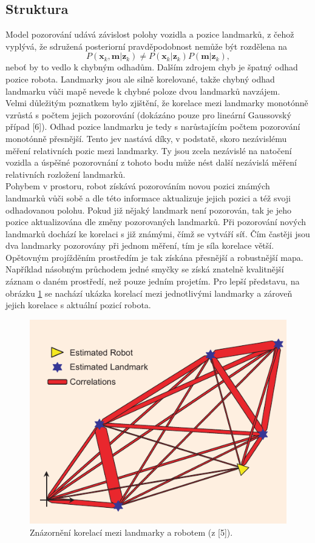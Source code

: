 \documentclass[12pt]{report}
\begin{document}
\subsection{Struktura}
Model pozorování udává závislost polohy vozidla a pozice landmarků, z čehož vyplývá, že sdružená posteriorní pravděpodobnost nemůže být rozdělena na
\begin{equation}
	P(\textbf{x}_k,\textbf{m}|\textbf{z}_k)\neq P(\textbf{x}_k|\textbf{z}_k)P(\textbf{m}|\textbf{z}_k),
\end{equation}
neboť by to vedlo k chybným odhadům. Dalším zdrojem chyb je špatný odhad pozice robota. Landmarky jsou ale silně korelované, takže chybný odhad landmarku vůči mapě nevede k chybné poloze dvou landmarků navzájem.\\
\indent Velmi důležitým poznatkem bylo zjištění, že korelace mezi landmarky monotónně vzrůstá s počtem jejich pozorování (dokázáno pouze pro lineární Gaussovský případ [6]). Odhad pozice landmarku je tedy s narůstajícím počtem pozorování monotónně přesnější. Tento jev nastává díky, v podstatě, skoro nezávislému měření relativních pozic mezi landmarky. Ty jsou zcela nezávislé na natočení vozidla a úspěšné pozorovnání z tohoto bodu může nést další nezávislá měření relativních rozložení landmarků. \\
\indent Pohybem v prostoru, robot získává pozorováním novou pozici známých landmarků vůči sobě a dle této informace aktualizuje jejich pozici a též svoji odhadovanou polohu. Pokud již nějaký landmark není pozorován, tak je jeho pozice aktualizována dle změny pozorovaných landmarků. Při pozorování nových landmarků dochází ke korelaci s již známými, čímž se vytváří síť. Čím častěji jsou dva landmarky pozorovány při jednom měření, tím je síla korelace větší. Opětovným projížděním prostředím je tak získána přesnější a robustnější mapa. Například násobným průchodem jedné smyčky se získá znatelně kvalitnější záznam o daném prostředí, než pouze jedním projetím. Pro lepší představu, na obrázku \ref{fig:SLAM_corelations} se nachází ukázka korelací mezi jednotlivými landmarky a zároveň jejich korelace s aktuální pozicí robota.\\

\begin{figure}[!ht]
	\begin{center}
		\includegraphics[width=0.6\columnwidth]{imgs/SLAM_corelations.pdf}
	\end{center}
	\caption{Znázornění korelací mezi landmarky a robotem (z [5]).}
	\label{fig:SLAM_corelations}
\end{figure}
\end{document}
